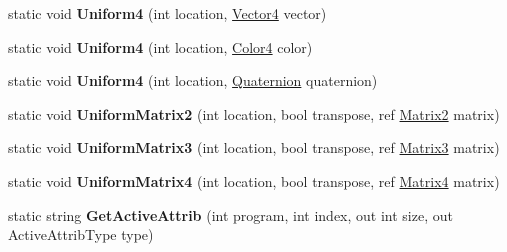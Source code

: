 \begin{DoxyCompactItemize}
\item 
\hypertarget{class_open_t_k_1_1_graphics_1_1_e_s20_1_1_g_l_a032510fdc2929a6737cf989dc1820366}{static void {\bfseries Uniform4} (int location, \hyperlink{struct_open_t_k_1_1_vector4}{Vector4} vector)}\label{class_open_t_k_1_1_graphics_1_1_e_s20_1_1_g_l_a032510fdc2929a6737cf989dc1820366}

\item 
\hypertarget{class_open_t_k_1_1_graphics_1_1_e_s20_1_1_g_l_a09adaa5d96acd4fac679f60a099faae2}{static void {\bfseries Uniform4} (int location, \hyperlink{struct_open_t_k_1_1_graphics_1_1_color4}{Color4} color)}\label{class_open_t_k_1_1_graphics_1_1_e_s20_1_1_g_l_a09adaa5d96acd4fac679f60a099faae2}

\item 
\hypertarget{class_open_t_k_1_1_graphics_1_1_e_s20_1_1_g_l_a543a88e62e02fcab2e136cb735e0d2ed}{static void {\bfseries Uniform4} (int location, \hyperlink{struct_open_t_k_1_1_quaternion}{Quaternion} quaternion)}\label{class_open_t_k_1_1_graphics_1_1_e_s20_1_1_g_l_a543a88e62e02fcab2e136cb735e0d2ed}

\item 
\hypertarget{class_open_t_k_1_1_graphics_1_1_e_s20_1_1_g_l_a30ea67a5a9e54558c439745fd4a69b08}{static void {\bfseries Uniform\-Matrix2} (int location, bool transpose, ref \hyperlink{struct_open_t_k_1_1_matrix2}{Matrix2} matrix)}\label{class_open_t_k_1_1_graphics_1_1_e_s20_1_1_g_l_a30ea67a5a9e54558c439745fd4a69b08}

\item 
\hypertarget{class_open_t_k_1_1_graphics_1_1_e_s20_1_1_g_l_ac9aee8bfe37f4114bf9386c243f01939}{static void {\bfseries Uniform\-Matrix3} (int location, bool transpose, ref \hyperlink{struct_open_t_k_1_1_matrix3}{Matrix3} matrix)}\label{class_open_t_k_1_1_graphics_1_1_e_s20_1_1_g_l_ac9aee8bfe37f4114bf9386c243f01939}

\item 
\hypertarget{class_open_t_k_1_1_graphics_1_1_e_s20_1_1_g_l_aee91a5027c0e1ba54e6ec1ed3672867c}{static void {\bfseries Uniform\-Matrix4} (int location, bool transpose, ref \hyperlink{struct_open_t_k_1_1_matrix4}{Matrix4} matrix)}\label{class_open_t_k_1_1_graphics_1_1_e_s20_1_1_g_l_aee91a5027c0e1ba54e6ec1ed3672867c}

\item 
\hypertarget{class_open_t_k_1_1_graphics_1_1_e_s20_1_1_g_l_abe0c4f060a0e956b50936b75750400cb}{static string {\bfseries Get\-Active\-Attrib} (int program, int index, out int size, out Active\-Attrib\-Type type)}\label{class_open_t_k_1_1_graphics_1_1_e_s20_1_1_g_l_abe0c4f060a0e956b50936b75750400cb}


\end{DoxyCompactItemize}
